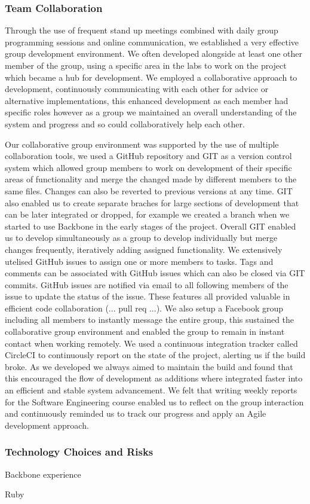 \subsubsection{Team Collaboration}
Through the use of frequent stand up meetings combined with daily group programming sessions and online communication, we established a very effective group development environment. We often developed alongside at least one other member of the group, using a specific area in the labs to work on the project which became a hub for development. We employed a collaborative approach to development, continuously communicating with each other for advice or alternative implementations, this enhanced development as each member had specific roles however as a group we maintained an overall understanding of the system and progress and so could collaboratively help each other.

Our collaborative group environment was supported by the use of multiple collaboration tools, we used a GitHub repository and GIT as a version control system which allowed group members to work on development of their specific areas of functionality and merge the changed made by different members to the same files. Changes can also be reverted to previous versions at any time. GIT also enabled us to create separate braches for large sections of development that can be later integrated or dropped, for example we created a branch when we started to use Backbone in the early stages of the project. Overall GIT enabled us to develop simultaneously as a group to develop individually but merge changes frequently, iteratively adding assigned functionality. We extensively utelised GitHub issues to assign one or more members to tasks. Tags and comments can be associated with GitHub issues which can also be closed via GIT commits. GitHub issues are notified via email to all following members of the issue to update the status of the issue. These features all provided valuable in efficient code collaboration (... pull req ...). We also setup a Facebook group including all members to instantly message the entire group, this sustained the collaborative group environment and enabled the group to remain in instant contact when working remotely. 
We used a continuous integration tracker called CircleCI to continuously report on the state of the project, alerting us if the build broke. As we developed we always aimed to maintain the build and found that this encouraged the flow of development as additions where integrated faster into an efficient and stable system advancement.
We felt that writing weekly reports for the Software Engineering course enabled us to reflect on the group interaction and continuously reminded us to track our progress and apply an Agile development approach.   

\subsubsection{Technology Choices and Risks}
Backbone experience

Ruby